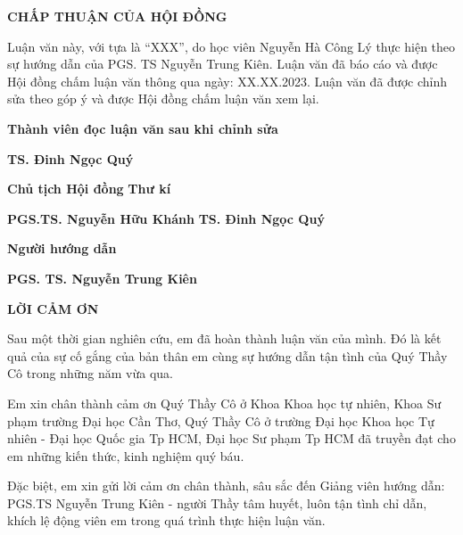 \documentclass[12pt,oneside,a4paper]{bookAnh1}
\theoremstyle{plain}
\theoremstyle{nonumberplain}
\numberwithin{equation}{chapter}
\begin{document}

\centerline{\bf\fontsize{14pt}{120}\selectfont CHẤP THUẬN CỦA HỘI ĐỒNG}
\vskip1cm
Luận văn này, với tựa là “XXX”, do học viên Nguyễn Hà Công Lý thực hiện theo sự hướng dẫn của PGS. TS Nguyễn Trung Kiên. Luận văn đã báo cáo và được Hội đồng chấm luận văn thông qua ngày: XX.XX.2023. Luận văn đã được chỉnh sửa theo góp ý và được Hội đồng chấm luận văn xem lại.
\vspace*{1cm}

\hskip 3.5cm \textbf{\textbf{Thành viên đọc luận văn sau khi chỉnh sửa}}
\vspace*{2.5cm}



\hskip 6cm \textbf{\textbf{TS. Đinh Ngọc Quý}}


\vspace*{1cm}
\hskip 1.5cm \textbf{\textbf{Chủ tịch Hội đồng}}	    \hskip 7.2cm \textbf{Thư kí}
\vspace*{2.5cm}


\hskip 0.7cm \textbf{\textbf{PGS.TS. Nguyễn Hữu Khánh}} \hskip 4.6cm \textbf{TS. Đinh Ngọc Quý}


\vspace*{1cm}
\hskip 6.6cm \textbf{\textbf{Người hướng dẫn}}	    
\vspace*{2.5cm}


\hskip 5.4cm \textbf{\textbf{PGS. TS. Nguyễn Trung Kiên}} 



\newpage
\centerline{\bf\fontsize{14pt}{120}\selectfont LỜI CẢM ƠN}
\vskip1cm
Sau một thời gian nghiên cứu, em đã hoàn thành luận văn của mình.  Đó là kết quả của sự cố gắng của bản thân em cùng sự hướng dẫn tận tình của Quý Thầy Cô trong những năm vừa qua.

Em xin chân thành cảm ơn Quý Thầy Cô ở Khoa Khoa học tự nhiên, Khoa Sư phạm trường Đại học Cần Thơ, Quý Thầy Cô ở trường Đại học Khoa học Tự nhiên - Đại học Quốc gia Tp HCM, Đại học Sư phạm Tp HCM đã truyền đạt cho em những kiến thức, kinh nghiệm quý báu.

Đặc biệt, em xin gửi lời cảm ơn chân thành, sâu sắc đến Giảng viên hướng dẫn: PGS.TS Nguyễn Trung Kiên - người Thầy tâm huyết, luôn tận tình chỉ dẫn, khích lệ động viên em trong quá trình thực hiện luận văn.
\end{document}
